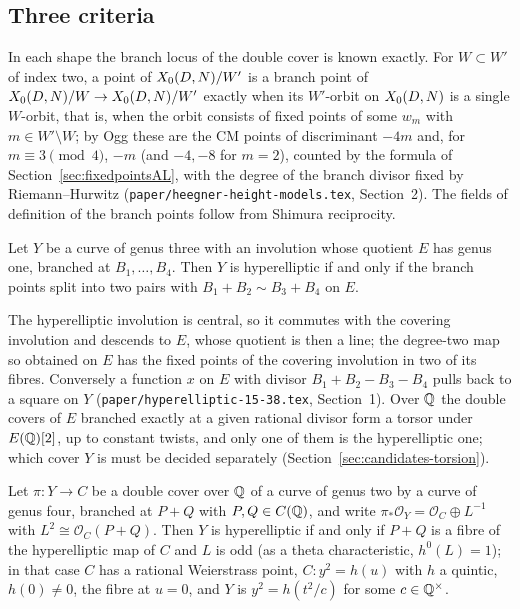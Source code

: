 \subsection{Three criteria}\label{sec:candidates-criteria}

In each shape the branch locus of the double cover is known exactly. For $W\subset W'$ of index two, a point of
$X_0({D},{N})/W'$ is a branch point of $X_0({D},{N})/W\to X_0({D},{N})/W'$ exactly when its $W'$-orbit on
$X_0({D},{N})$ is a single $W$-orbit, that is, when the orbit consists of fixed points of some $w_m$ with
$m\in W'\setminus W$; by Ogg these are the CM points of discriminant $-4m$ and, for $m\equiv3\pmod4$, $-m$ (and
$-4,-8$ for $m=2$), counted by the formula of Section~\ref{sec:fixedpointsAL}, with the degree of the branch
divisor fixed by Riemann--Hurwitz (\texttt{paper/heegner-height-models.tex}, Section~2). The fields of definition
of the branch points follow from Shimura reciprocity.

\begin{proposition}\label{prop:bielliptic}
Let $Y$ be a curve of genus three with an involution whose quotient $E$ has genus one, branched at
$B_1,\dots,B_4$. Then $Y$ is hyperelliptic if and only if the branch points split into two pairs with
$B_1+B_2\sim B_3+B_4$ on $E$.
\end{proposition}

The hyperelliptic involution is central, so it commutes with the covering involution and descends to $E$, whose
quotient is then a line; the degree-two map so obtained on $E$ has the fixed points of the covering involution in
two of its fibres. Conversely a function $x$ on $E$ with divisor $B_1+B_2-B_3-B_4$ pulls back to a square on $Y$
(\texttt{paper/hyperelliptic-15-38.tex}, Section~1). Over $\mathbb{Q}$ the double covers of $E$ branched exactly at a
given rational divisor form a torsor under $E(\mathbb{Q})[2]$, up to constant twists, and only one of them is the
hyperelliptic one; which cover $Y$ is must be decided separately (Section~\ref{sec:candidates-torsion}).

\begin{proposition}\label{prop:normalform}
Let $\pi\colon Y\to C$ be a double cover over $\mathbb{Q}$ of a curve of genus two by a curve of genus four, branched at
$P+Q$ with $P,Q\in C(\mathbb{Q})$, and write $\pi_*\mathcal O_Y=\mathcal O_C\oplus L^{-1}$ with $L^2\cong\mathcal O_C(P+Q)$.
Then $Y$ is hyperelliptic if and only if $P+Q$ is a fibre of the hyperelliptic map of $C$ and $L$ is odd (as a
theta characteristic, $h^0(L)=1$); in that case $C$ has a rational Weierstrass point, $C\colon y^2=h(u)$ with $h$ a quintic, $h(0)\neq0$,
the fibre at $u=0$, and $Y$ is $y^2=h(t^2/c)$ for some $c\in\mathbb{Q}^\times$.
\end{proposition}

